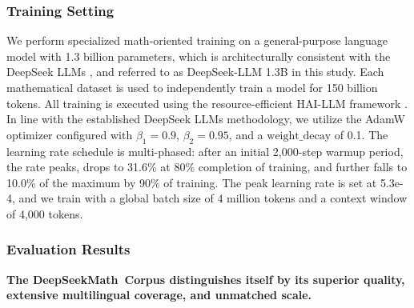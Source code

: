 \begin{itemize}[topsep=0pt]
\subsubsection{Training Setting}
\label{sec:quality-policy}
We perform specialized math-oriented training on a general-purpose language model with 1.3 billion parameters, which is architecturally consistent with the DeepSeek LLMs \citep{deepseek-llm}, and referred to as DeepSeek-LLM 1.3B in this study. Each mathematical dataset is used to independently train a model for 150 billion tokens. All training is executed using the resource-efficient HAI-LLM framework \citep{haillm}. In line with the established DeepSeek LLMs methodology, we utilize the AdamW optimizer \citep{adamW} configured with $\beta_1=0.9$, $\beta_2=0.95$, and a $\mathrm{weight\_decay}$ of 0.1. The learning rate schedule is multi-phased: after an initial 2,000-step warmup period, the rate peaks, drops to 31.6\% at 80\% completion of training, and further falls to 10.0\% of the maximum by 90\% of training. The peak learning rate is set at 5.3e-4, and we train with a global batch size of 4 million tokens and a context window of 4,000 tokens.

\subsubsection{Evaluation Results}

\textbf{The DeepSeekMath~Corpus distinguishes itself by its superior quality, extensive multilingual coverage, and unmatched scale.}


\end{itemize}

